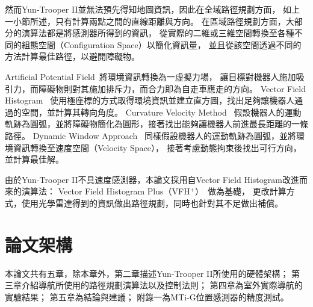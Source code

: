然而Yun-Trooper II並無法預先得知地圖資訊，因此在全域路徑規劃方面，
如上一小節所述，只有計算兩點之間的直線距離與方向。
在區域路徑規劃方面，大部分的演算法都是將感測器所得到的資訊，
從實際的二維或三維空間轉換至各種不同的組態空間（Configuration Space）以簡化資訊量，
並且從該空間透過不同的方法計算最佳路徑，以避開障礙物。

Artificial Potential Field~\cite{Khatib:1985:APF}將環境資訊轉換為一虛擬力場，
讓目標對機器人施加吸引力，而障礙物則對其施加排斥力，而合力即為自走車應走的方向。
Vector Field Histogram~\cite{Borenstein:1991:VFH}
使用極座標的方式取得環境資訊並建立直方圖，找出足夠讓機器人通過的空間，並計算其轉向角度。
Curvature Velocity Method~\cite{Simmons:1996:CVM}
假設機器人的運動軌跡為圓弧，並將障礙物簡化為圓形，接著找出能夠讓機器人前進最長距離的一條路徑。
Dynamic Window Approach~\cite{Thrun:1997:DW}
同樣假設機器人的運動軌跡為圓弧，並將環境資訊轉換至速度空間（Velocity Space），
接著考慮動態拘束後找出可行方向，並計算最佳解。

由於Yun-Trooper II不具速度感測器，本論文採用自Vector Field Histogram改進而來的演算法：
Vector Field Histogram Plus（VFH$^+$）~\cite{Ulrich:1998:VFHPlus}做為基礎，
更改計算方式，使用光學雷達得到的資訊做出路徑規劃，同時也針對其不足做出補償。

\section{論文架構}
本論文共有五章，除本章外，第二章描述Yun-Trooper II所使用的硬體架構；
第三章介紹導航所使用的路徑規劃演算法以及控制法則；
第四章為室外實際導航的實驗結果；
第五章為結論與建議；
附錄一為MTi-G位置感測器的精度測試。

